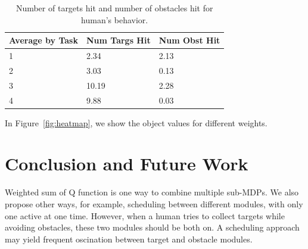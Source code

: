 \documentclass[11pt]{article} %
\begin{document}
\begin{table}[h]
\centering
\begin{tabular}{| l| l| l |}
\hline
Average by Task & Num Targs Hit & Num Obst Hit\\
\hline
1 & 2.34 &  2.13\\
\hline
2 & 3.03 &  0.13\\
\hline
3 & 10.19 & 2.28\\
\hline
4 & 9.88 &  0.03\\
\hline
\end{tabular}
\caption{Number of targets hit and number of obstacles hit for human's behavior.}
\end{table}

In Figure~\ref{fig:heatmap}, we show the object values for different weights.

\section{Conclusion and Future Work}

Weighted sum of Q function is one way to combine multiple sub-MDPs. We also
propose other ways, for example, scheduling between different modules, with only
one active at one time. However, when a human tries to collect targets while
avoiding obstacles, these two modules should be both on. A scheduling approach
may yield frequent oscination between target and obstacle modules.



\end{document}
